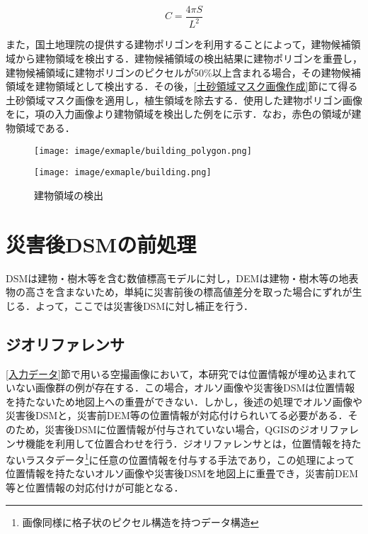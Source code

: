       \begin{equation}
        \label{円形度}
        C = \dfrac{4 \pi S} {L^2} 
      \end{equation}

      また，国土地理院の提供する建物ポリゴンを利用することによって，建物候補領域から建物領域を検出する．建物候補領域の検出結果に建物ポリゴンを重畳し，建物候補領域に建物ポリゴンのピクセルが50\%以上含まれる場合，その建物候補領域を建物領域として検出する．その後，\ref{土砂領域マスク画像作成}節にて得る土砂領域マスク画像を適用し，植生領域を除去する．使用した建物ポリゴン画像をに，項の入力画像より建物領域を検出した例をに示す．なお，赤色の領域が建物領域である．

      \begin{figure}[t]
        \begin{minipage}[c]{0.45\hsize}
          \centering
          \texttt{[image: image/exmaple/building\_polygon.png]}
          \label{建物ポリゴン}
        \end{minipage}
        \begin{minipage}[c]{0.45\hsize}
          \centering
          \texttt{[image: image/exmaple/building.png]}
          \label{建物領域検出結果}
        \end{minipage}
        \caption{建物領域の検出}
      \end{figure}



  \section{災害後DSMの前処理}
    \label{災害後DSMの前処理}
    DSMは建物・樹木等を含む数値標高モデルに対し，DEMは建物・樹木等の地表物の高さを含まないため，単純に災害前後の標高値差分を取った場合にずれが生じる．よって，ここでは災害後DSMに対し補正を行う．


    \subsection{ジオリファレンサ}
      \label{ジオリファレンサ}
      \ref{入力データ}節で用いる空撮画像において，本研究では位置情報が埋め込まれていない画像群の例が存在する．この場合，オルソ画像や災害後DSMは位置情報を持たないため地図上への重畳ができない．しかし，後述の処理でオルソ画像や災害後DSMと，災害前DEM等の位置情報が対応付けられいてる必要がある．そのため，災害後DSMに位置情報が付与されていない場合，QGISのジオリファレンサ機能を利用して位置合わせを行う．ジオリファレンサとは，位置情報を持たないラスタデータ\footnote{画像同様に格子状のピクセル構造を持つデータ構造}に任意の位置情報を付与する手法であり，この処理によって位置情報を持たないオルソ画像や災害後DSMを地図上に重畳でき，災害前DEM等と位置情報の対応付けが可能となる．

